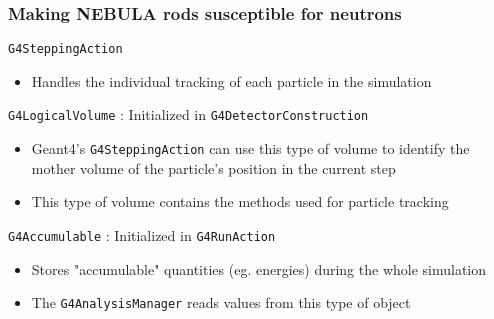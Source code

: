 \begin{frame}
\frametitle{Making NEBULA rods susceptible for neutrons}

\begin{block}{\texttt{G4SteppingAction}}
	\begin{itemize}
		\item Handles the individual tracking of each particle in the simulation
	\end{itemize}
\end{block}

\begin{block}{\texttt{G4LogicalVolume} : Initialized in \texttt{G4DetectorConstruction}}
	\begin{itemize}
		\item Geant4's \texttt{G4SteppingAction} can use this type of volume to identify the mother volume of the particle's position in the current step
		\item This type of volume contains the methods used for particle tracking
	\end{itemize}
\end{block}

\begin{alertblock}{\texttt{G4Accumulable} : Initialized in \texttt{G4RunAction}}
	\begin{itemize}
		\item Stores "accumulable" quantities (eg. energies) during the whole simulation
		\item The \texttt{G4AnalysisManager} reads values from this type of object
	\end{itemize}
\end{alertblock}


\end{frame}